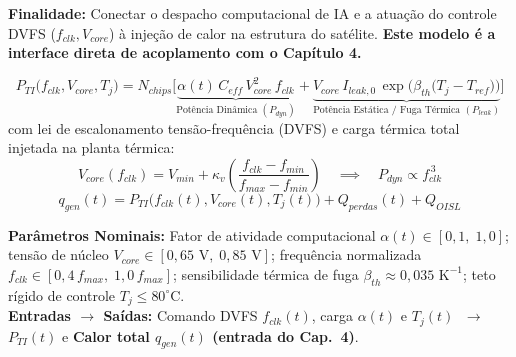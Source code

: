 \documentclass[11pt,a4paper]{article}
\begin{document}
\begin{tcolorbox}[colback=boxbg, colframe=bordergreen, title=\color{ifesdark}\textbf{MODELO 4: DINÂMICA ELETROTÉRMICA DAS CARGAS DE IA (GERAÇÃO DE CALOR E DVFS)}]
\small
\textbf{Finalidade:} Conectar o despacho computacional de IA e a atuação do controle DVFS ($f_{clk}, V_{core}$) à injeção de calor na estrutura do satélite. \textbf{Este modelo é a interface direta de acoplamento com o Capítulo 4.}

\vspace{-4pt}
\begin{equation}
    P_{TI}\big(f_{clk}, V_{core}, T_j\big) = N_{chips} \Big[ \underbrace{\alpha(t) \, C_{eff} \, V_{core}^2 \, f_{clk}}_{\text{Potência Dinâmica } (P_{dyn})} + \underbrace{V_{core} \, I_{leak,0} \, \exp\!\Big(\beta_{th} \big(T_j - T_{ref}\big)\Big)}_{\text{Potência Estática / Fuga Térmica } (P_{leak})} \Big]
    \label{eq:potencia_ia}
\end{equation}
com lei de escalonamento tensão-frequência (DVFS) e carga térmica total injetada na planta térmica:
\begin{equation}
    V_{core}(f_{clk}) = V_{min} + \kappa_v \left( \frac{f_{clk} - f_{min}}{f_{max} - f_{min}} \right) \quad \implies \quad P_{dyn} \propto f_{clk}^{\,3}
    \label{eq:dvfs_lei}
\end{equation}
\begin{equation}
    q_{gen}(t) = P_{TI}\big(f_{clk}(t), V_{core}(t), T_j(t)\big) + Q_{perdas}(t) + Q_{OISL}
    \label{eq:qgen_total}
\end{equation}

\vspace{2pt}
\noindent\textbf{Parâmetros Nominais:} Fator de atividade computacional $\alpha(t) \in [0{,}1,\; 1{,}0]$; tensão de núcleo $V_{core} \in [0{,}65\text{ V},\; 0{,}85\text{ V}]$; frequência normalizada $f_{clk} \in [0{,}4\,f_{max},\; 1{,}0\,f_{max}]$; sensibilidade térmica de fuga $\beta_{th} \approx 0{,}035\text{ K}^{-1}$; teto rígido de controle $T_j \le 80^\circ\text{C}$.\\
\textbf{Entradas $\to$ Saídas:} Comando DVFS $f_{clk}(t)$, carga $\alpha(t)$ e $T_j(t)$ $\;\longrightarrow\;$ \textbf{$P_{TI}(t)$} e \textbf{Calor total $q_{gen}(t)$ (entrada do Cap.~4)}.
\end{tcolorbox}

\vspace{6pt}
\end{document}
